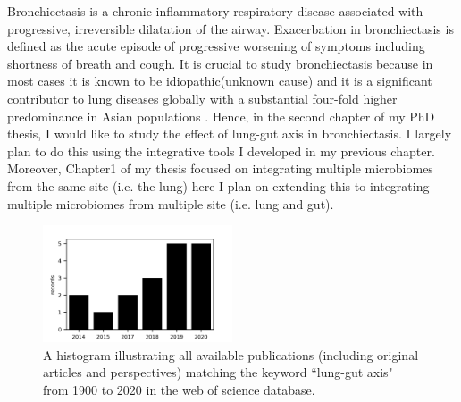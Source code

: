 Bronchiectasis is a chronic inflammatory respiratory disease associated with progressive, irreversible dilatation of the airway. Exacerbation in bronchiectasis is defined as the acute episode of progressive worsening of symptoms including shortness of breath and cough. It is crucial to study bronchiectasis because in most cases it is known to be idiopathic(unknown cause) \cite{pmid29478908} and it is a significant contributor to lung diseases globally with a substantial four-fold higher predominance in Asian populations \cite{Seitz2012}. Hence, in the second chapter of my PhD thesis, I would like to study the effect of lung-gut axis in bronchiectasis. I largely plan to do this using the integrative tools I developed in my previous chapter. Moreover, Chapter1 of my thesis focused on integrating multiple microbiomes from the same site (i.e. the lung) here I plan on extending this to integrating multiple microbiomes from multiple site (i.e. lung and gut). 

\begin{figure}[ht]
	\centering
	\includegraphics[width=0.5\textwidth]{./image/bar-papers.png}
	\caption{A histogram illustrating all available publications (including original articles and perspectives) matching the keyword ``lung-gut axis" from 1900 to 2020 in the web of science database.}
	\label{ch2_fig1}
\end{figure}